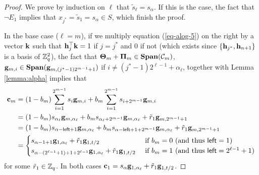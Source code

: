 \begin{proof}
We prove by induction on \(\ell\) that \(\tilde{s}_\ell=s_{\alpha}\). If this is the case, the fact that \(\neg E_1\) implies that \(x_{j^*}=\tilde{s}_1=s_{\alpha}\in S\), which finish the proof.

In the base case ($\ell=m$), if we multiply equation (\ref{eq-alog-5}) on the right by a vector \(\mathbf{k}\) such that \(\mathbf{h}_j^\top\mathbf{k}=1\) if \(j=j^*\) and \(0\) if not (which exists since \(\{\mathbf{h}_{j^*},\mathbf{h}_{n+1}\}\) is a basis of \(\mathbb{Z}_q^2\)), the fact that \(\mathbf{{\Theta}}_m+\mathbf{{\Pi}}_m\in\mathbf{Span}(\mathcal{C}_m)\), \(\mathbf{g}_{m,i}\in\mathbf{Span}(\mathbf{g}_{m,(j^*-1)2^{m-1}+1})\) if \(i\neq (j^*-1)2^{\ell-1}+\alpha_\ell\), together with Lemma \ref{lemma:alpha} implies that 
\begin{align*}
\mathbf{c}_m &= (1-b_m)\sum_{i=1}^{2^{m-1}}s_i \mathbf{g}_{m,i}+b_m\sum_{i=1}^{2^{m-1}}s_{i+2^{m-1}}\mathbf{g}_{m,i}\\
&= (1-b_m)s_{\alpha_\ell}\mathbf{g}_{m,\alpha_\ell} +b_ms_{\alpha_\ell+2^{m-1}}\mathbf{g}_{m,\alpha_\ell}+\tilde{r}_1\mathbf{g}_{m,2^{m-1}+1}\\
&= (1-b_m)s_{\alpha-{\mathsf{left}}+1}\mathbf{g}_{m,\alpha_\ell} +b_ms_{\alpha-{\mathsf{left}}+1+2^{m-1}}\mathbf{g}_{m,\alpha_\ell}+\tilde{r}_1\mathbf{g}_{m,2^{m-1}+1}\\
&=\begin{cases}
    s_{\alpha-1+1}\mathbf{g}_{1,\alpha_\ell}+\tilde{r}_1\mathbf{g}_{1,t/2} & \text{ if } b_m=0 \ (\text{and thus }{\mathsf{left}}=1) \\
    s_{\alpha-(2^{\ell-1}+1)+1+2^{\ell-1}}\mathbf{g}_{1,\alpha_\ell}+\tilde{r}_1\mathbf{g}_{1,t/2} & \text{ if } b_m=1 \ (\text{and thus }{\mathsf{left}}=2^{\ell-1}+1) 
\end{cases}
\end{align*}
for some \(\tilde{r}_1\in\mathbb{Z}_q\). In both cases $\mathbf{c}_1=s_\alpha\mathbf{g}_{1,\alpha_\ell}+\tilde{r}_1\mathbf{g}_{1,t/2}$.


\end{proof}
